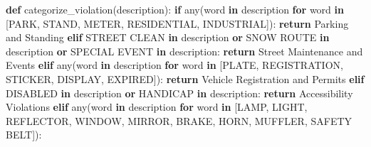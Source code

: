 \documentclass[
  letterpaper,
  DIV=11,
  numbers=noendperiod]{scrartcl}
\newenvironment{Shaded}{\begin{snugshade}}{\end{snugshade}}
\newcommand{\BuiltInTok}[1]{\textcolor[rgb]{0.00,0.23,0.31}{#1}}
\newcommand{\ControlFlowTok}[1]{\textcolor[rgb]{0.00,0.23,0.31}{\textbf{#1}}}
\newcommand{\KeywordTok}[1]{\textcolor[rgb]{0.00,0.23,0.31}{\textbf{#1}}}
\newcommand{\NormalTok}[1]{\textcolor[rgb]{0.00,0.23,0.31}{#1}}
\newcommand{\StringTok}[1]{\textcolor[rgb]{0.13,0.47,0.30}{#1}}
\begin{document}
\begin{Shaded}
\begin{Highlighting}[]
\KeywordTok{def}\NormalTok{ categorize\_violation(description):}
    \ControlFlowTok{if} \BuiltInTok{any}\NormalTok{(word }\KeywordTok{in}\NormalTok{ description }\ControlFlowTok{for}\NormalTok{ word }\KeywordTok{in}\NormalTok{ [}\StringTok{\textquotesingle{}PARK\textquotesingle{}}\NormalTok{, }\StringTok{\textquotesingle{}STAND\textquotesingle{}}\NormalTok{, }\StringTok{\textquotesingle{}METER\textquotesingle{}}\NormalTok{, }\StringTok{\textquotesingle{}RESIDENTIAL\textquotesingle{}}\NormalTok{, }\StringTok{\textquotesingle{}INDUSTRIAL\textquotesingle{}}\NormalTok{]):}
        \ControlFlowTok{return} \StringTok{\textquotesingle{}Parking and Standing\textquotesingle{}}
    \ControlFlowTok{elif} \StringTok{\textquotesingle{}STREET CLEAN\textquotesingle{}} \KeywordTok{in}\NormalTok{ description }\KeywordTok{or} \StringTok{\textquotesingle{}SNOW ROUTE\textquotesingle{}} \KeywordTok{in}\NormalTok{ description }\KeywordTok{or} \StringTok{\textquotesingle{}SPECIAL EVENT\textquotesingle{}} \KeywordTok{in}\NormalTok{ description:}
        \ControlFlowTok{return} \StringTok{\textquotesingle{}Street Maintenance and Events\textquotesingle{}}
    \ControlFlowTok{elif} \BuiltInTok{any}\NormalTok{(word }\KeywordTok{in}\NormalTok{ description }\ControlFlowTok{for}\NormalTok{ word }\KeywordTok{in}\NormalTok{ [}\StringTok{\textquotesingle{}PLATE\textquotesingle{}}\NormalTok{, }\StringTok{\textquotesingle{}REGISTRATION\textquotesingle{}}\NormalTok{, }\StringTok{\textquotesingle{}STICKER\textquotesingle{}}\NormalTok{, }\StringTok{\textquotesingle{}DISPLAY\textquotesingle{}}\NormalTok{, }\StringTok{\textquotesingle{}EXPIRED\textquotesingle{}}\NormalTok{]):}
        \ControlFlowTok{return} \StringTok{\textquotesingle{}Vehicle Registration and Permits\textquotesingle{}}
    \ControlFlowTok{elif} \StringTok{\textquotesingle{}DISABLED\textquotesingle{}} \KeywordTok{in}\NormalTok{ description }\KeywordTok{or} \StringTok{\textquotesingle{}HANDICAP\textquotesingle{}} \KeywordTok{in}\NormalTok{ description:}
        \ControlFlowTok{return} \StringTok{\textquotesingle{}Accessibility Violations\textquotesingle{}}
    \ControlFlowTok{elif} \BuiltInTok{any}\NormalTok{(word }\KeywordTok{in}\NormalTok{ description }\ControlFlowTok{for}\NormalTok{ word }\KeywordTok{in}\NormalTok{ [}\StringTok{\textquotesingle{}LAMP\textquotesingle{}}\NormalTok{, }\StringTok{\textquotesingle{}LIGHT\textquotesingle{}}\NormalTok{, }\StringTok{\textquotesingle{}REFLECTOR\textquotesingle{}}\NormalTok{, }\StringTok{\textquotesingle{}WINDOW\textquotesingle{}}\NormalTok{, }\StringTok{\textquotesingle{}MIRROR\textquotesingle{}}\NormalTok{, }\StringTok{\textquotesingle{}BRAKE\textquotesingle{}}\NormalTok{, }\StringTok{\textquotesingle{}HORN\textquotesingle{}}\NormalTok{, }\StringTok{\textquotesingle{}MUFFLER\textquotesingle{}}\NormalTok{, }\StringTok{\textquotesingle{}SAFETY BELT\textquotesingle{}}\NormalTok{]):}

\end{Highlighting}
\end{Shaded}
\end{document}
